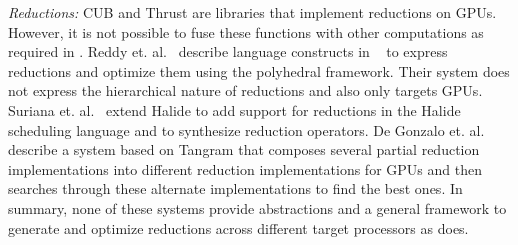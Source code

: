 \emph{Reductions:} CUB\cite{CUB} and Thrust\cite{Thrust} are libraries 
that implement reductions on GPUs. 
However, it is not possible to fuse these functions with other computations  
as required in \Treebeard{}. Reddy et. al.~\cite{ChandanReduction}
describe language constructs in {}~\cite{Pencil}
to express reductions and optimize them using the polyhedral 
framework. 
Their system does not express the hierarchical nature of 
reductions and also only targets GPUs. Suriana et. al.~\cite{HalideReductions}
extend Halide to add support for reductions in the Halide 
scheduling language and to synthesize reduction operators. De Gonzalo 
et. al.~\cite{TangramReduction} describe a system based on Tangram 
that composes several partial reduction implementations into different 
reduction implementations for GPUs and then searches through these
alternate implementations to find the best ones. In summary, none of 
these systems provide abstractions and a general framework to generate 
and optimize reductions across different target processors as \Treebeard{} does.
